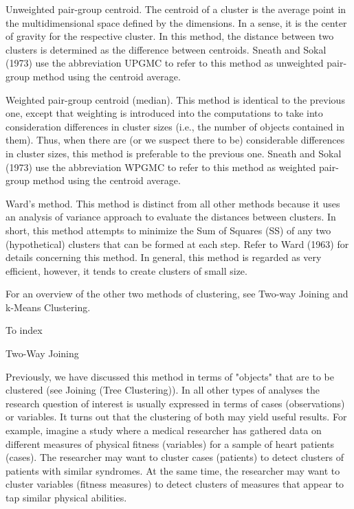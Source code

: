 Unweighted pair-group centroid. The centroid of a cluster is the average point in the multidimensional space defined by the dimensions. In a sense, it is the center of gravity for the respective cluster. In this method, the distance between two clusters is determined as the difference between centroids. Sneath and Sokal (1973) use the abbreviation UPGMC to refer to this method as unweighted pair-group method using the centroid average.

Weighted pair-group centroid (median). This method is identical to the previous one, except that weighting is introduced into the computations to take into consideration differences in cluster sizes (i.e., the number of objects contained in them). Thus, when there are (or we suspect there to be) considerable differences in cluster sizes, this method is preferable to the previous one. Sneath and Sokal (1973) use the abbreviation WPGMC to refer to this method as weighted pair-group method using the centroid average.

Ward's method. This method is distinct from all other methods because it uses an analysis of variance approach to evaluate the distances between clusters. In short, this method attempts to minimize the Sum of Squares (SS) of any two (hypothetical) clusters that can be formed at each step. Refer to Ward (1963) for details concerning this method. In general, this method is regarded as very efficient, however, it tends to create clusters of small size.

For an overview of the other two methods of clustering, see Two-way Joining and k-Means Clustering.

To index

 
Two-Way Joining


Previously, we have discussed this method in terms of "objects" that are to be clustered (see Joining (Tree Clustering)). In all other types of analyses the research question of interest is usually expressed in terms of cases (observations) or variables. It turns out that the clustering of both may yield useful results. For example, imagine a study where a medical researcher has gathered data on different measures of physical fitness (variables) for a sample of heart patients (cases). The researcher may want to cluster cases (patients) to detect clusters of patients with similar syndromes. At the same time, the researcher may want to cluster variables (fitness measures) to detect clusters of measures that appear to tap similar physical abilities.

